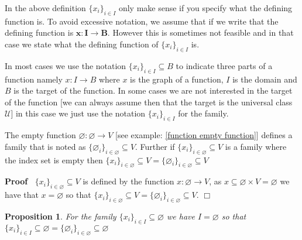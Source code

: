 \documentclass{book}
\newcommand{\tmmathbf}[1]{\ensuremath{\boldsymbol{#1}}}
\newcommand{\tmtextbf}[1]{\text{{\bfseries{#1}}}}
\newenvironment{proof}{\noindent\textbf{Proof\ }}{\hspace*{\fill}$\Box$\medskip}
\newtheorem{proposition}{Proposition}
{\theorembodyfont{\rmfamily}\newtheorem{remark}{Remark}}
\begin{document}
\begin{note}
  In the above definition $\{ x_i \}_{i \in I}$ only make sense if you specify
  what the defining function is. To avoid excessive notation, we assume that
  if we write \tmtextbf{$\{ x \}_{i \in I} \subseteq B$} that the defining
  function is $\tmmathbf{x : I \rightarrow B}$. However this is sometimes not
  feasible and in that case we state what the defining function of $\{ x_i
  \}_{i \in I}$ is. 
\end{note}

\begin{note}
  In most cases we use the notation $\{ x_i \}_{i \in I} \subseteq B$ to
  indicate three parts of a function namely $x : I \rightarrow B$ where $x$ is
  the graph of a function, $I$ is the domain and $B$ is the target of the
  function. In some cases we are not interested in the target of the function
  [we can always assume then that the target is the universal class
  $\mathcal{U}$] in this case we just use the notation $\{ x_i \}_{i \in I}$
  for the family.
\end{note}

\begin{example}
  \label{family empty family}The empty function $\varnothing : \varnothing
  \rightarrow V$ [see example: \ref{function empty function}] defines a family
  that is noted as $\{ \varnothing_i \}_{i \in \varnothing} \subseteq V$.
  Further if $\{ x_i \}_{i \in \varnothing} \subseteq V$ is a family where the
  index set is empty then $\{ x_i \}_{i \in \varnothing} \subseteq V = \{
  \varnothing_i \}_{i \in \varnothing} \subseteq V$
\end{example}

\begin{proof}
  $\{ x_i \}_{i \in \varnothing} \subseteq V$ is defined by the function $x :
  \varnothing \rightarrow V$, as $x \subseteq \varnothing \times V =
  \varnothing$ we have that $x = \varnothing$ so that $\{ x_i \}_{i \in
  \varnothing} \subseteq V = \{ \varnothing_i \}_{i \in \varnothing} \subseteq
  V$.
\end{proof}

\begin{proposition}
  \label{family empty family condition}For the family $\{ x_i \}_{i \in I}
  \subseteq \varnothing$ we have $I = \varnothing$ so that $\{ x_i \}_{i \in
  I} \subseteq \varnothing = \{ \varnothing_i \}_{i \in \varnothing} \subseteq
  \varnothing$
\end{proposition}
\end{document}

